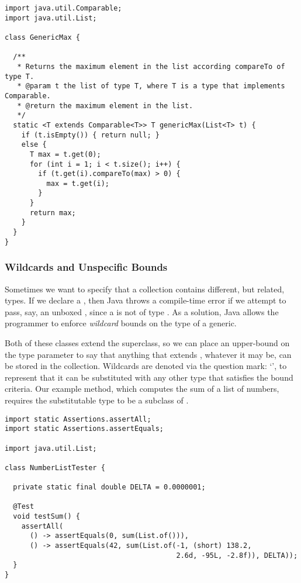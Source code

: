 \begin{lstlisting}[language=MyJava]
import java.util.Comparable;
import java.util.List;

class GenericMax {
  
  /**
   * Returns the maximum element in the list according compareTo of type T.
   * @param t the list of type T, where T is a type that implements Comparable.
   * @return the maximum element in the list.
   */
  static <T extends Comparable<T>> T genericMax(List<T> t) {
    if (t.isEmpty()) { return null; }
    else {
      T max = t.get(0);
      for (int i = 1; i < t.size(); i++) {
        if (t.get(i).compareTo(max) > 0) { 
          max = t.get(i); 
        }
      }
      return max;
    }
  }
}
\end{lstlisting}

\subsubsection*{Wildcards and Unspecific Bounds}
Sometimes we want to specify that a collection contains different, but related, types. 
If we declare a , then Java throws a compile-time error if we attempt to pass, say, an unboxed , since a  is not of type . 
As a solution, Java allows the programmer to enforce \emph{wildcard} bounds on the type of a generic. 

Both of these classes extend the  superclass, so we can place an upper-bound on the type parameter to say that anything that extends , whatever it may be, can be stored in the collection. 
Wildcards are denoted via the question mark: `', to represent that it can be substituted with any other type that satisfies the bound criteria. 
Our example method, which computes the sum of a list of numbers, requires the substitutable type to be a subclass of .

\begin{lstlisting}[language=MyJava]
import static Assertions.assertAll;
import static Assertions.assertEquals;

import java.util.List;

class NumberListTester {

  private static final double DELTA = 0.0000001;

  @Test
  void testSum() {
    assertAll(
      () -> assertEquals(0, sum(List.of())),
      () -> assertEquals(42, sum(List.of(-1, (short) 138.2, 
                                         2.6d, -95L, -2.8f)), DELTA));
  }
}
\end{lstlisting}

